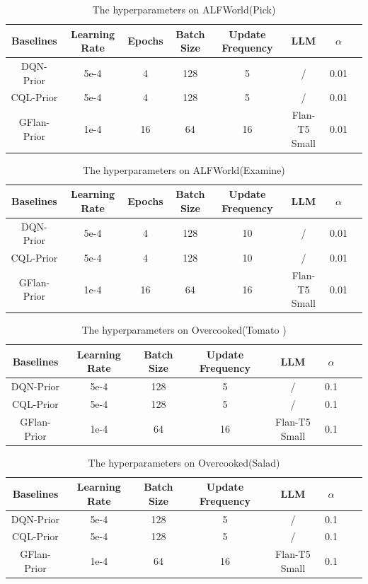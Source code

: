 \begin{table}[]
    \caption{The hyperparameters on ALFWorld(Pick)}
    \centering
    \begin{tabular}{cccccccc}
    \hline
    Baselines & Learning Rate & Epochs & Batch Size & Update Frequency& LLM &$\alpha$\\
    \hline
        DQN-Prior & 5e-4& 4&128&5&/ &0.01  \\
        CQL-Prior & 5e-4& 4&128&5  &/ &0.01 \\
        GFlan-Prior  & 1e-4& 16&64&16&Flan-T5 Small&0.01  \\
    \hline
        \end{tabular}
    \label{tab:paralake}
\end{table}
\begin{table}[]
    \caption{The hyperparameters on ALFWorld(Examine)}
    \centering
    \begin{tabular}{cccccccc}
    \hline
    Baselines & Learning Rate & Epochs & Batch Size & Update Frequency& LLM &$\alpha$\\
    \hline
        DQN-Prior & 5e-4& 4&128&10&/ &0.01  \\
        CQL-Prior & 5e-4& 4&128&10  &/ &0.01 \\
        GFlan-Prior  & 1e-4& 16&64&16&Flan-T5 Small&0.01  \\
    \hline
        \end{tabular}
    \label{tab:paralake}
\end{table}
\begin{table}[]
    \caption{The hyperparameters on Overcooked(Tomato
    )}
    \centering
    \begin{tabular}{cccccccc}
    \hline
    Baselines & Learning Rate  & Batch Size & Update Frequency& LLM &$\alpha$\\
    \hline
        DQN-Prior & 5e-4&128&5&/ &0.1  \\
        CQL-Prior & 5e-4&128&5  &/ &0.1 \\
        GFlan-Prior  & 1e-4&64&16&Flan-T5 Small&0.1  \\
    \hline
        \end{tabular}
    \label{tab:tomato}
\end{table}
\begin{table}[]
    \caption{The hyperparameters on Overcooked(Salad)}
    \centering
    \begin{tabular}{cccccccc}
    \hline
    Baselines & Learning Rate  & Batch Size & Update Frequency& LLM &$\alpha$\\
    \hline
        DQN-Prior & 5e-4&128&5&/ &0.1  \\
        CQL-Prior & 5e-4&128&5  &/ &0.1 \\
        GFlan-Prior  & 1e-4&64&16&Flan-T5 Small&0.1  \\
    \hline
        \end{tabular}
    \label{tab:salad}
\end{table}
